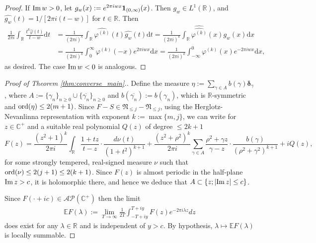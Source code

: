 \documentclass[a4paper,reqno,12pt]{amsart}
\newcommand{\A}{\mathcal{A}}
\renewcommand{\P}{\mathcal{P}}
\newcommand{\NN}{\mathfrak{N}}
\renewcommand{\r}{\mathbb{R}}
\newcommand{\cp}{\mathbb{C}} %
\newcommand{\ft}{\widehat}
\newcommand{\bo}{\boldsymbol}
\newcommand{\la}{\lambda}
\newcommand{\ga}{\gamma}
\newcommand{\p}{\varphi}
\newcommand{\ord}{{\rm ord}}
\renewcommand{\d}{\mathrm{d}}
\newcommand{\ov}[1]{\overline{#1}}
\newcommand{\cd}{\cdot}
\newcommand{\1}{{\bf 1}}
\newcommand{\ra}{\rightarrow}
\newcommand{\e}{\mathbb{E}}
\newcommand{\mt}{\mapsto}
\newcommand{\del}{{\bo \delta}}
\renewcommand{\Im}{{\rm Im}\,}
\begin{document}
\begin{proof}
If $\Im{w}>0$, let $g_w(x):=e^{2\pi iwx}\1_{(0,\infty)}(x)$. Then $g_w\in L^1(\r)$, and $\ft{g_w}(t)=1/[2\pi i(t-w)]$ for $t\in\r$. Then
\begin{align*}
    \frac{1}{2\pi i} \int_{\r} \frac{t^k\ft{\p}(t)}{t-w}\d t&=\frac{1}{(2\pi i)^k} \int_{\r} \ft{\p^{(k)}}(t)\ft{g_w}(t)\d t=\frac{1}{(2\pi i)^k} \int_{\r} \ft{\ft{\p^{(k)}}}(x)g_w(x)\d x\\
    &=\frac{1}{(2\pi i)^k} \int_{0}^{\infty} \p^{(k)}(-x)e^{2\pi iwx}\d x=\frac{1}{(2\pi i)^k} \int_{-\infty}^{0} \p^{(k)}(x)e^{-2\pi iwx}\d x,
\end{align*}
as desired. The case $\Im{w}<0$ is analogous.
\end{proof}

\begin{proof}[Proof of Theorem \ref{thm:converse_main}.]
Define the measure $\eta:=\sum_{\ga\in A} b(\ga)\del_\ga$, where $A:=\{\ga_n\}_{n\geq0}\cup\{\ov{\ga_n}\}_{n\geq0}$ and $b(\ov{\ga_n}):=b(\ga_n)$, which is $\r$-symmetric and $\ord(\eta)\leq2(m+1)$. Since $F-S\in\NN_{\leq j}-\NN_{\leq j}$, using the Herglotz-Nevanlinna representation with exponent $k:=\max\{m,j\}$, we can write for $z\in\cp^+$ and a suitable real polynomial $Q(z)$ of degree $\leq 2k+1$
\begin{equation}
\label{eq:thm2_F_representation}
    F(z)= \frac{(z^2+1)^k}{2\pi i} \int_{\r} \frac{1+tz}{t-z}\cd\frac{d\nu(t)}{(1+t^2)^{k+1}}+\frac{(z^2+\rho^2)^k}{2\pi i} \sum_{\ga\in A} \frac{\rho^2+\ga z}{\ga-z}\cd\frac{b(\ga)}{(\rho^2+\ga^2)^{k+1}}+iQ(z),
\end{equation}
for some strongly tempered, real-signed measure $\nu$ such that $\ord{(\nu)}\leq 2(j+1)\leq2(k+1)$. Since $F(z)$ is almost periodic in the half-plane $\Im{z}>c$, it is holomorphic there, and hence we deduce that $A\subset\{z;|\Im{z}|\leq c\}$.

Since $F(\cd+ic)\in\A\P(\cp^+)$ then the limit
\begin{align*}
\e F(\la):=\lim_{T\ra\infty} \frac{1}{2T}\int_{-T+iy}^{T+iy} F(z)e^{-2\pi i\la z}dz
\end{align*}
does exist for any $\la\in\r$ and is independent of $y>c$. By hypothesis, $\la\mt\e F(\la)$ is locally summable.


\end{proof}
\end{document}
